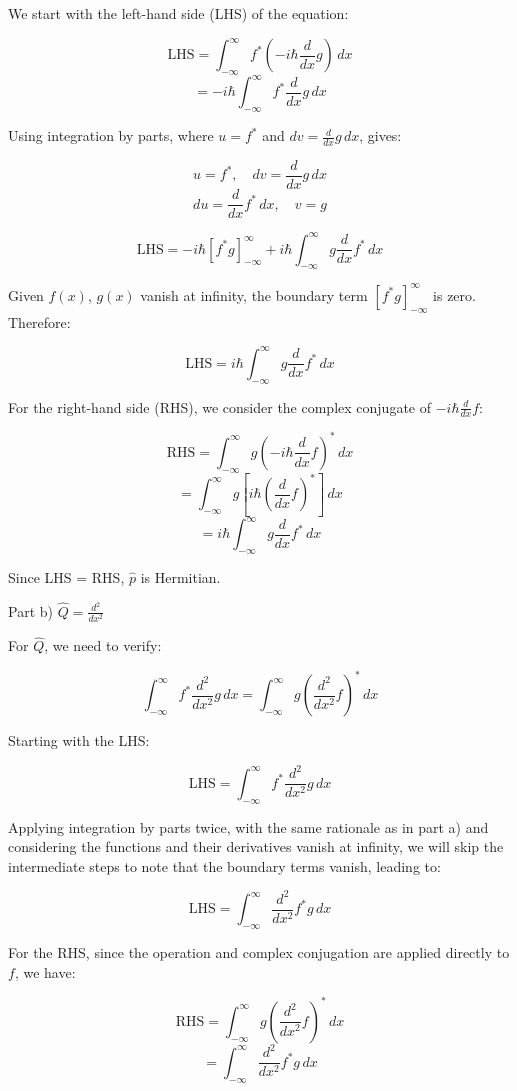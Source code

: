 \documentclass[a4paper,11pt]{article}
\begin{document}
We start with the left-hand side (LHS) of the equation:

\[ \text{LHS} = \int_{-\infty}^{\infty} f^{*}(-i\hbar\frac{d}{dx}g) \, dx \]
\[ = -i\hbar\int_{-\infty}^{\infty} f^{*}\frac{d}{dx}g \, dx \]

Using integration by parts, where \( u = f^{*} \) and \( dv = \frac{d}{dx}g \, dx \), gives:

\[ u = f^{*}, \quad dv = \frac{d}{dx}g \, dx \]
\[ du = \frac{d}{dx}f^{*} \, dx, \quad v = g \]

\[ \text{LHS} = -i\hbar[f^{*}g]_{-\infty}^{\infty} + i\hbar\int_{-\infty}^{\infty} g\frac{d}{dx}f^{*} \, dx \]

Given \( f(x) \), \( g(x) \) vanish at infinity, the boundary term \( [f^{*}g]_{-\infty}^{\infty} \) is zero. Therefore:

\[ \text{LHS} = i\hbar\int_{-\infty}^{\infty} g\frac{d}{dx}f^{*} \, dx \]

For the right-hand side (RHS), we consider the complex conjugate of \( -i\hbar\frac{d}{dx}f \):

\[ \text{RHS} = \int_{-\infty}^{\infty} g(-i\hbar\frac{d}{dx}f)^{*} \, dx \]
\[ = \int_{-\infty}^{\infty} g[i\hbar(\frac{d}{dx}f)^{*}] \, dx \]
\[ = i\hbar\int_{-\infty}^{\infty} g\frac{d}{dx}f^{*} \, dx \]

Since LHS = RHS, \( \hat{p} \) is Hermitian.

Part b) \( \hat{Q} = \frac{d^{2}}{dx^{2}} \)

For \( \hat{Q} \), we need to verify:

\[ \int_{-\infty}^{\infty} f^{*}\frac{d^{2}}{dx^{2}}g \, dx = \int_{-\infty}^{\infty} g(\frac{d^{2}}{dx^{2}}f)^{*} \, dx \]

Starting with the LHS:

\[ \text{LHS} = \int_{-\infty}^{\infty} f^{*}\frac{d^{2}}{dx^{2}}g \, dx \]

Applying integration by parts twice, with the same rationale as in part a) and considering the functions and their derivatives vanish at infinity, we will skip the intermediate steps to note that the boundary terms vanish, leading to:

\[ \text{LHS} = \int_{-\infty}^{\infty} \frac{d^{2}}{dx^{2}}f^{*} g \, dx \]

For the RHS, since the operation and complex conjugation are applied directly to \( f \), we have:

\[ \text{RHS} = \int_{-\infty}^{\infty} g(\frac{d^{2}}{dx^{2}}f)^{*} \, dx \]
\[ = \int_{-\infty}^{\infty} \frac{d^{2}}{dx^{2}}f^{*} g \, dx \]
\end{document}
